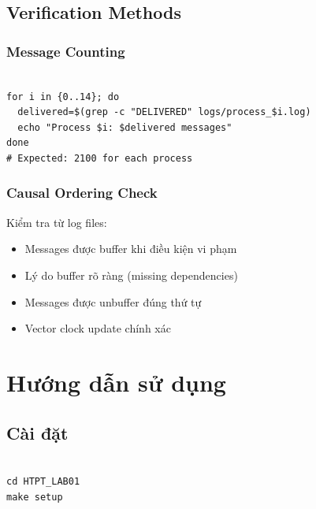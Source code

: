 \subsection{Verification Methods}

\subsubsection{Message Counting}
\begin{listing}[H]
\begin{verbatim}

for i in {0..14}; do
  delivered=$(grep -c "DELIVERED" logs/process_$i.log)
  echo "Process $i: $delivered messages"
done
# Expected: 2100 for each process
\end{verbatim}
\caption{Verify Message Count}
\end{listing}

\subsubsection{Causal Ordering Check}
Kiểm tra từ log files:
\begin{itemize}
    \item Messages được buffer khi điều kiện vi phạm
    \item Lý do buffer rõ ràng (missing dependencies)
    \item Messages được unbuffer đúng thứ tự
    \item Vector clock update chính xác
\end{itemize}

\section{Hướng dẫn sử dụng}

\subsection{Cài đặt}

\begin{listing}[H]
\begin{verbatim}

cd HTPT_LAB01
make setup
\end{verbatim}
\caption{Setup}
\end{listing}

